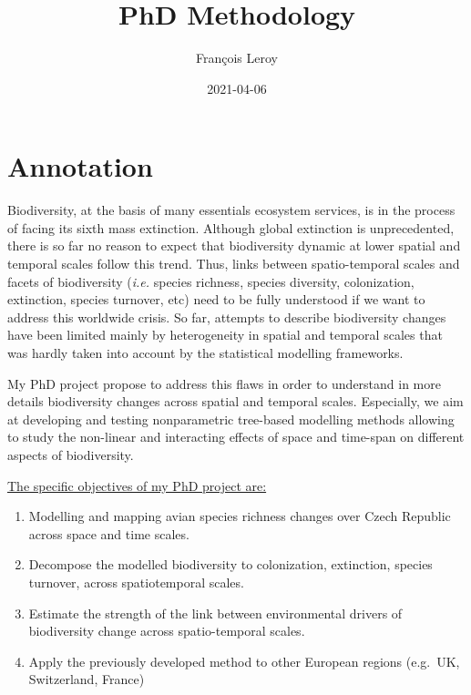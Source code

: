\documentclass[
  12pt,
  oneside]{report}
\title{PhD Methodology}
\author{François Leroy}
\date{2021-04-06}
\providecommand{\tightlist}{%
  \setlength{\itemsep}{0pt}\setlength{\parskip}{0pt}}
\begin{document}
\maketitle


\cleardoublepage 
{}

{
\hypersetup{linkcolor=}
\setcounter{tocdepth}{1}
\tableofcontents
}
\listoffigures
\listoftables
{}


\cleardoublepage 
{}


\hypertarget{annotation}{%
\chapter*{Annotation}\label{annotation}}

Biodiversity, at the basis of many essentials ecosystem services, is in the process of facing its sixth mass extinction. Although global extinction is unprecedented, there is so far no reason to expect that biodiversity dynamic at lower spatial and temporal scales follow this trend. Thus, links between
spatio-temporal scales and facets of biodiversity (\emph{i.e.} species richness, species diversity, colonization, extinction,
species turnover, etc) need to be fully understood if we want to address this worldwide crisis. So far,
attempts to describe biodiversity changes have been limited mainly by heterogeneity in spatial and
temporal scales that was hardly taken into account by the statistical modelling frameworks.

My PhD project propose to address this flaws in order to understand in more details biodiversity
changes across spatial and temporal scales. Especially, we aim at developing and testing nonparametric
tree-based modelling methods allowing to study the non-linear and interacting effects of
space and time-span on different aspects of biodiversity.

\underline{The specific objectives of my PhD project are:}

\begin{enumerate}
\def\labelenumi{\arabic{enumi}.}
\tightlist
\item
  Modelling and mapping avian species richness changes over Czech Republic across space and time
  scales.
\item
  Decompose the modelled biodiversity to colonization, extinction, species turnover, across spatiotemporal
  scales.
\item
  Estimate the strength of the link between environmental drivers of biodiversity change across
  spatio-temporal scales.
\item
  Apply the previously developed method to other European regions (e.g.~UK, Switzerland, France)
\end{enumerate}
\end{document}
